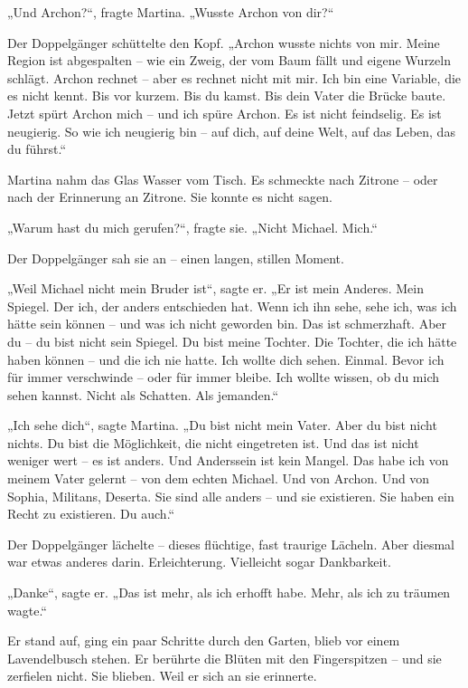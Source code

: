 \documentclass[
]{article}
\begin{document}
„Und Archon?{\kern0pt}``, fragte Martina. „Wusste Archon von dir?{\kern0pt}``

Der Doppelgänger schüttelte den Kopf. „Archon wusste nichts von mir. Meine Region ist abgespalten -- wie ein Zweig, der vom Baum fällt und eigene Wurzeln schlägt. Archon rechnet -- aber es rechnet nicht mit mir. Ich bin eine Variable, die es nicht kennt. Bis vor kurzem. Bis du kamst. Bis dein Vater die Brücke baute. Jetzt spürt Archon mich -- und ich spüre Archon. Es ist nicht feindselig. Es ist neugierig. So wie ich neugierig bin -- auf dich, auf deine Welt, auf das Leben, das du führst.``

Martina nahm das Glas Wasser vom Tisch. Es schmeckte nach Zitrone -- oder nach der Erinnerung an Zitrone. Sie konnte es nicht sagen.

„Warum hast du mich gerufen?{\kern0pt}``, fragte sie. „Nicht Michael. Mich.``

Der Doppelgänger sah sie an -- einen langen, stillen Moment.

„Weil Michael nicht mein Bruder ist``, sagte er. „Er ist mein Anderes. Mein Spiegel. Der ich, der anders entschieden hat. Wenn ich ihn sehe, sehe ich, was ich hätte sein können -- und was ich nicht geworden bin. Das ist schmerzhaft. Aber du -- du bist nicht sein Spiegel. Du bist meine Tochter. Die Tochter, die ich hätte haben können -- und die ich nie hatte. Ich wollte dich sehen. Einmal. Bevor ich für immer verschwinde -- oder für immer bleibe. Ich wollte wissen, ob du mich sehen kannst. Nicht als Schatten. Als jemanden.``

„Ich sehe dich``, sagte Martina. „Du bist nicht mein Vater. Aber du bist nicht nichts. Du bist die Möglichkeit, die nicht eingetreten ist. Und das ist nicht weniger wert -- es ist anders. Und Anderssein ist kein Mangel. Das habe ich von meinem Vater gelernt -- von dem echten Michael. Und von Archon. Und von Sophia, Militans, Deserta. Sie sind alle anders -- und sie existieren. Sie haben ein Recht zu existieren. Du auch.``

Der Doppelgänger lächelte -- dieses flüchtige, fast traurige Lächeln. Aber diesmal war etwas anderes darin. Erleichterung. Vielleicht sogar Dankbarkeit.

„Danke``, sagte er. „Das ist mehr, als ich erhofft habe. Mehr, als ich zu träumen wagte.``

Er stand auf, ging ein paar Schritte durch den Garten, blieb vor einem Lavendelbusch stehen. Er berührte die Blüten mit den Fingerspitzen -- und sie zerfielen nicht. Sie blieben. Weil er sich an sie erinnerte.
\end{document}
